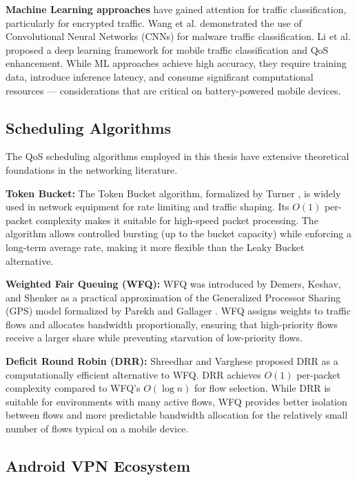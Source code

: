\textbf{Machine Learning approaches} have gained attention for traffic classification, particularly for encrypted traffic. Wang et al. \cite{wang2017machine} demonstrated the use of Convolutional Neural Networks (CNNs) for malware traffic classification. Li et al. \cite{li2019mobile} proposed a deep learning framework for mobile traffic classification and QoS enhancement. While ML approaches achieve high accuracy, they require training data, introduce inference latency, and consume significant computational resources --- considerations that are critical on battery-powered mobile devices.

\subsection{Scheduling Algorithms}

The QoS scheduling algorithms employed in this thesis have extensive theoretical foundations in the networking literature.

\textbf{Token Bucket:} The Token Bucket algorithm, formalized by Turner \cite{peterson2011computer}, is widely used in network equipment for rate limiting and traffic shaping. Its $O(1)$ per-packet complexity makes it suitable for high-speed packet processing. The algorithm allows controlled bursting (up to the bucket capacity) while enforcing a long-term average rate, making it more flexible than the Leaky Bucket alternative.

\textbf{Weighted Fair Queuing (WFQ):} WFQ was introduced by Demers, Keshav, and Shenker \cite{demers1989analysis} as a practical approximation of the Generalized Processor Sharing (GPS) model formalized by Parekh and Gallager \cite{parekh1993generalized}. WFQ assigns weights to traffic flows and allocates bandwidth proportionally, ensuring that high-priority flows receive a larger share while preventing starvation of low-priority flows.

\textbf{Deficit Round Robin (DRR):} Shreedhar and Varghese \cite{shreedhar1996efficient} proposed DRR as a computationally efficient alternative to WFQ. DRR achieves $O(1)$ per-packet complexity compared to WFQ's $O(\log n)$ for flow selection. While DRR is suitable for environments with many active flows, WFQ provides better isolation between flows and more predictable bandwidth allocation for the relatively small number of flows typical on a mobile device.

\subsection{Android VPN Ecosystem}

